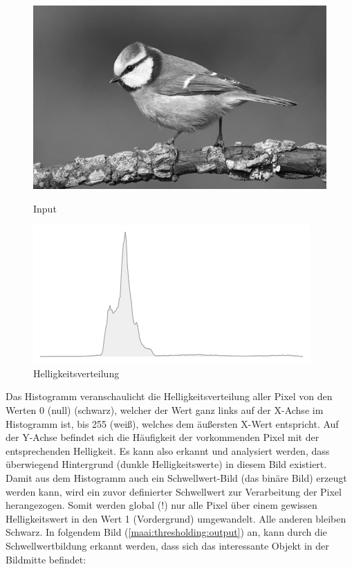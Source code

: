 \begin{figure}[htb]
  \centering
  \begin{minipage}[t]{0.45\linewidth}
    \centering
    \includegraphics[width=\linewidth]{pics/bildverarbeitungsalgos/grayscaling_output.png}
    \caption{Input}
    \label{maai:thresholding:input}
  \end{minipage}
  \hfill
  \begin{minipage}[t]{0.45\linewidth}
    \centering
    \includegraphics[width=\linewidth]{pics/bildverarbeitungsalgos/thresholding_histogram.png}
    \caption{Helligkeitsverteilung}
    \label{maai:thresholding:histogramm}
  \end{minipage}
\end{figure}

Das Histogramm veranschaulicht die Helligkeitsverteilung aller Pixel von den Werten 0 (null) (schwarz), welcher der Wert ganz links auf der X-Achse im Histogramm ist, bis 255 (weiß), welches dem äußersten X-Wert entspricht. Auf der Y-Achse befindet sich die Häufigkeit der vorkommenden Pixel mit der entsprechenden Helligkeit.
Es kann also erkannt und analysiert werden, dass überwiegend Hintergrund (dunkle Helligkeitswerte) in diesem Bild existiert. Damit aus dem Histogramm auch ein Schwellwert-Bild (das binäre Bild) erzeugt werden kann, wird ein zuvor definierter Schwellwert zur Verarbeitung der Pixel herangezogen. Somit werden global (!) nur alle Pixel über einem gewissen Helligkeitswert in den Wert 1 (Vordergrund) umgewandelt. Alle anderen bleiben Schwarz. In folgendem Bild (\ref{maai:thresholding:output}) an, kann durch die Schwellwertbildung erkannt werden, dass sich das interessante Objekt in der Bildmitte befindet:


